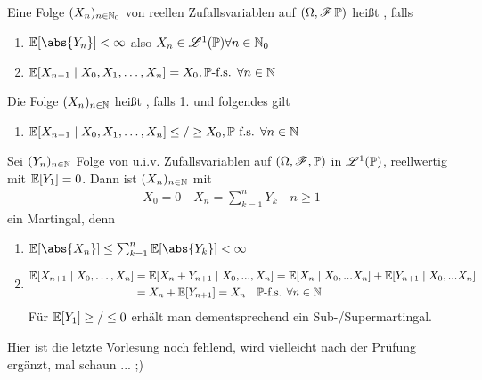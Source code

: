 \begin{definition}
	Eine Folge $(X_n)_{n \in \mathbb{N}_0}$ von reellen Zufallsvariablen auf $(\Omega,\mathscr F\,\mathbb{P})$ heißt , falls
	\begin{enumerate}
		\item $\E[\abs{Y_n}] < \infty$ also $X_n \in \mathscr{L}^{1}(\mathbb{P})\forall n \in \mathbb{N}_0$
		\item $\mathbb{E}[X_{n-1} \mid X_0, X_1, \dots, X_n] = X_0, \mathbb{P}\text{-f.s. }\forall n \in \mathbb{N}$
	\end{enumerate}
	Die Folge $(X_n)_{n\in \mathbb{N}}$ heißt , falls 1. und folgendes gilt
	\begin{enumerate}
		\item $\mathbb{E}[X_{n-1} \mid X_0, X_1, \dots, X_n] \le /\ge X_0, \mathbb{P}\text{-f.s. }\forall n \in \mathbb{N}$
	\end{enumerate} 
\end{definition}
\begin{example}
	Sei $(Y_n)_{n\in \mathbb{N}}$ Folge von u.i.v. Zufallsvariablen auf $(\Omega,\mathscr F,\mathbb{P})$ in $\mathscr{L}^{1}(\mathbb{P})$, reellwertig mit $\mathbb{E}[Y_1] = 0$. Dann ist $(X_n)_{n\in \mathbb{N}}$ mit 
	\begin{align*}
		X_0 = 0 \quad X_n = \sum_{k=1}^n Y_k \quad n \ge 1
	\end{align*}
	ein Martingal, denn
	\begin{enumerate}
		\item $\E[\abs{X_n}] \le \sum_{k=1}^n \E[\abs{Y_k}] < \infty$
		\item 
		\begin{align*}
			\mathbb{E}[X_{n+1}\mid X_0, \dots, X_n] &= \mathbb{E}[X_n + Y_{n+1} \mid X_0 , ... , X_n] = \mathbb{E}[X_n \mid X_0, ... X_n] + \mathbb{E}[Y_{n+1} \mid X_0, ... X_n]\\
			&= X_n + \mathbb{E}[Y_{n+1}] = X_n \quad \mathbb{P}\text{-f.s. } \forall n \in \mathbb{N}
		\end{align*}
		Für $\mathbb{E}[Y_1] \ge / \le 0$ erhält man dementsprechend ein Sub-/Supermartingal.
	\end{enumerate}
\end{example}
Hier ist die letzte Vorlesung noch fehlend, wird vielleicht nach der Prüfung ergänzt, mal schaun ... ;)